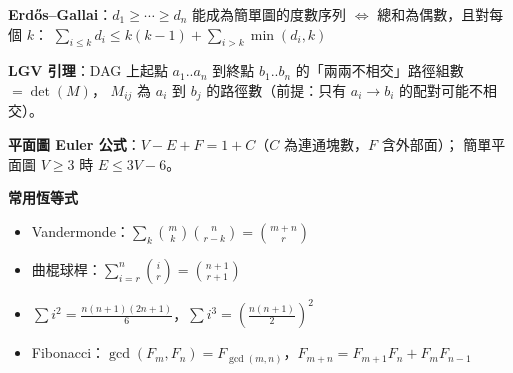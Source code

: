 {\textbf{Erd\H{o}s--Gallai}：$d_1 \ge \cdots \ge d_n$ 能成為簡單圖的度數序列 $\iff$
總和為偶數，且對每個 $k$：
$\sum_{i\le k} d_i \le k(k-1) + \sum_{i>k}\min(d_i, k)$

\textbf{LGV 引理}：DAG 上起點 $a_1..a_n$ 到終點 $b_1..b_n$ 的「兩兩不相交」路徑組數 $= \det(M)$，
$M_{ij}$ 為 $a_i$ 到 $b_j$ 的路徑數（前提：只有 $a_i \to b_i$ 的配對可能不相交）。

\textbf{平面圖 Euler 公式}：$V - E + F = 1 + C$（$C$ 為連通塊數，$F$ 含外部面）；
簡單平面圖 $V \ge 3$ 時 $E \le 3V - 6$。

\smallskip
\textbf{常用恆等式}
\begin{itemize}\setlength{\itemsep}{0pt}\setlength{\parskip}{0pt}
\item Vandermonde：$\sum_k \binom{m}{k}\binom{n}{r-k} = \binom{m+n}{r}$
\item 曲棍球桿：$\sum_{i=r}^{n}\binom{i}{r} = \binom{n+1}{r+1}$
\item $\sum i^2 = \frac{n(n+1)(2n+1)}{6}$，$\sum i^3 = \left(\frac{n(n+1)}{2}\right)^2$
\item Fibonacci：$\gcd(F_m, F_n) = F_{\gcd(m,n)}$，$F_{m+n} = F_{m+1}F_n + F_mF_{n-1}$
\end{itemize}
\par}
